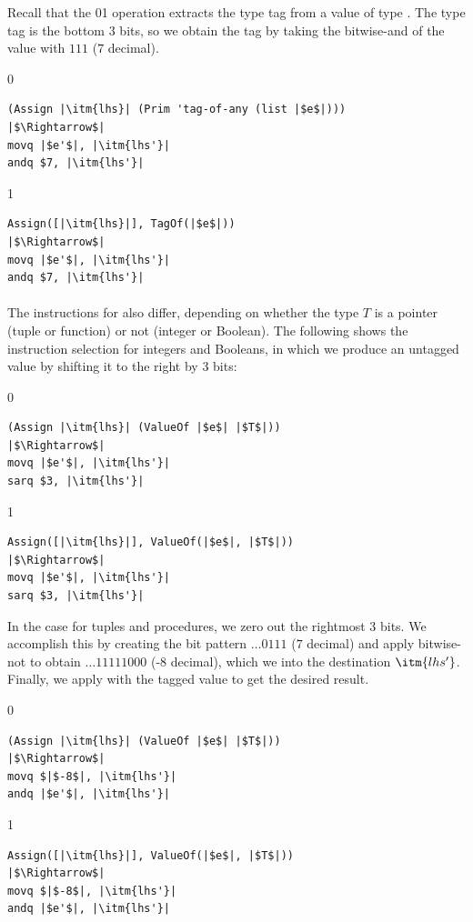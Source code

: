 \documentclass[7x10]{TimesAPriori_MIT}%
\def\racketEd{0}
\def\pythonEd{1}
\def\edition{1}
\newcommand{\racket}[1]{{\if\edition\racketEd{#1}\fi}}
\newcommand{\pythonColor}[0]{}
\newcommand{\python}[1]{{\if\edition\pythonEd\pythonColor #1\fi}}
\numberwithin{theorem}{chapter}
\numberwithin{definition}{chapter}
\numberwithin{equation}{chapter}
\begin{document}
Recall that the \racket{}\python{}
operation extracts the type tag from a value of type \ANYTY{}. The
type tag is the bottom $3$ bits, so we obtain the tag by taking the
bitwise-and of the value with $111$ ($7$ decimal).
%
{\if\edition\racketEd
\begin{lstlisting}
(Assign |\itm{lhs}| (Prim 'tag-of-any (list |$e$|)))
|$\Rightarrow$|
movq |$e'$|, |\itm{lhs'}|
andq $7, |\itm{lhs'}|
\end{lstlisting}
\fi}
%
{\if\edition\pythonEd\pythonColor
\begin{lstlisting}
Assign([|\itm{lhs}|], TagOf(|$e$|))
|$\Rightarrow$|
movq |$e'$|, |\itm{lhs'}|
andq $7, |\itm{lhs'}|
\end{lstlisting}
\fi}


\paragraph{}

The instructions for  also differ, depending on whether
the type $T$ is a pointer (tuple or function) or not (integer or
Boolean). The following shows the instruction
selection for integers and
Booleans, in which we produce an untagged value by shifting it to the
right by 3 bits:
%
{\if\edition\racketEd
\begin{lstlisting}
(Assign |\itm{lhs}| (ValueOf |$e$| |$T$|))
|$\Rightarrow$|
movq |$e'$|, |\itm{lhs'}|
sarq $3, |\itm{lhs'}|
\end{lstlisting}
\fi}
%
{\if\edition\pythonEd\pythonColor
\begin{lstlisting}
Assign([|\itm{lhs}|], ValueOf(|$e$|, |$T$|))
|$\Rightarrow$|
movq |$e'$|, |\itm{lhs'}|
sarq $3, |\itm{lhs'}|
\end{lstlisting}
\fi}
%
In the case for tuples and procedures, we zero out the rightmost 3
bits. We accomplish this by creating the bit pattern $\ldots 0111$
($7$ decimal) and apply bitwise-not to obtain $\ldots 11111000$ (-8
decimal), which we  into the destination $\itm{lhs'}$.
Finally, we apply  with the tagged value to get the desired
result.
%
{\if\edition\racketEd
\begin{lstlisting}
(Assign |\itm{lhs}| (ValueOf |$e$| |$T$|))
|$\Rightarrow$|
movq $|$-8$|, |\itm{lhs'}|
andq |$e'$|, |\itm{lhs'}|
\end{lstlisting}
\fi}
%
{\if\edition\pythonEd\pythonColor
\begin{lstlisting}
Assign([|\itm{lhs}|], ValueOf(|$e$|, |$T$|))
|$\Rightarrow$|
movq $|$-8$|, |\itm{lhs'}|
andq |$e'$|, |\itm{lhs'}|
\end{lstlisting}
\fi}
\end{document}
